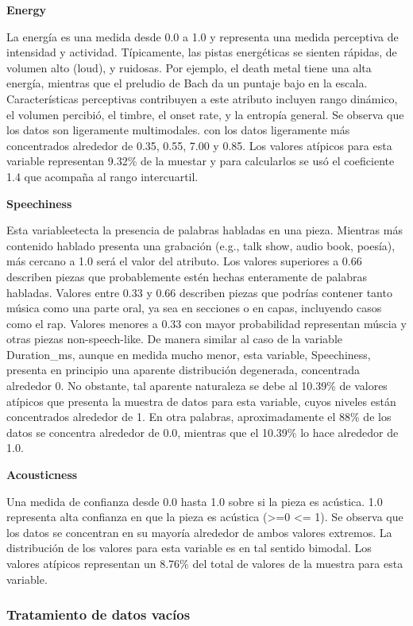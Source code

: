 \documentclass[
  letterpaper,
  DIV=11,
  numbers=noendperiod]{scrartcl}
\begin{document}
\textbf{Energy}

La energía es una medida desde 0.0 a 1.0 y representa una medida
perceptiva de intensidad y actividad. Típicamente, las pistas
energéticas se sienten rápidas, de volumen alto (loud), y ruidosas. Por
ejemplo, el death metal tiene una alta energía, mientras que el preludio
de Bach da un puntaje bajo en la escala. Características perceptivas
contribuyen a este atributo incluyen rango dinámico, el volumen
percibió, el timbre, el onset rate, y la entropía general. Se observa
que los datos son ligeramente multimodales. con los datos ligeramente
más concentrados alrededor de 0.35, 0.55, 7.00 y 0.85. Los valores
atípicos para esta variable representan 9.32\% de la muestar y para
calcularlos se usó el coeficiente 1.4 que acompaña al rango
intercuartil.

\textbf{Speechiness}

Esta variableetecta la presencia de palabras habladas en una pieza.
Mientras más contenido hablado presenta una grabación (e.g., talk show,
audio book, poesía), más cercano a 1.0 será el valor del atributo. Los
valores superiores a 0.66 describen piezas que probablemente estén
hechas enteramente de palabras habladas. Valores entre 0.33 y 0.66
describen piezas que podrías contener tanto música como una parte oral,
ya sea en secciones o en capas, incluyendo casos como el rap. Valores
menores a 0.33 con mayor probabilidad representan múscia y otras piezas
non-speech-like. De manera similar al caso de la variable Duration\_ms,
aunque en medida mucho menor, esta variable, Speechiness, presenta en
principio una aparente distribución degenerada, concentrada alrededor 0.
No obstante, tal aparente naturaleza se debe al 10.39\% de valores
atípicos que presenta la muestra de datos para esta variable, cuyos
niveles están concentrados alrededor de 1. En otra palabras,
aproximadamente el 88\% de los datos se concentra alrededor de 0.0,
mientras que el 10.39\% lo hace alrededor de 1.0.

\textbf{Acousticness}

Una medida de confianza desde 0.0 hasta 1.0 sobre si la pieza es
acústica. 1.0 representa alta confianza en que la pieza es acústica
(\textgreater=0 \textbar{} \textless= 1). Se observa que los datos se
concentran en su mayoría alrededor de ambos valores extremos. La
distribución de los valores para esta variable es en tal sentido
bimodal. Los valores atípicos representan un 8.76\% del total de valores
de la muestra para esta variable.

\hypertarget{tratamiento-de-datos-vacuxedos}{%
\subsubsection{Tratamiento de datos
vacíos}\label{tratamiento-de-datos-vacuxedos}}
\end{document}
